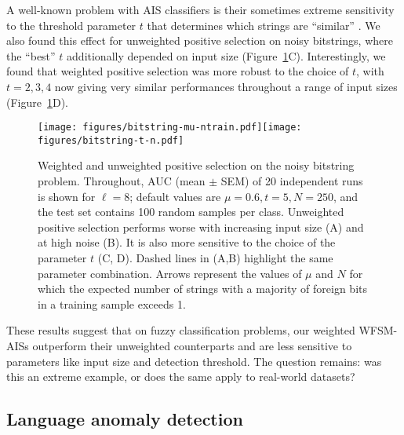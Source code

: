 \documentclass{llncs}
\begin{document}
A well-known problem with AIS classifiers  is their sometimes extreme sensitivity to the 
threshold parameter $t$ that determines which strings are ``similar''
\cite{Dhaeseleer1996,Dhaeseleer1996b,Stibor2005,Wortel2020t}.
We also found this effect for 
unweighted positive selection on noisy bitstrings, where the ``best'' $t$ additionally
depended on input size (Figure~\ref{figurestringdistinction}C). Interestingly, we 
found that weighted positive selection was more robust to the choice of $t$, with 
$t = 2,3,4$ now giving very similar performances throughout a range of input sizes (Figure~\ref{figurestringdistinction}D).


\begin{figure}[t]
  \centering
   \texttt{[image: figures/bitstring-mu-ntrain.pdf]}\texttt{[image: figures/bitstring-t-n.pdf]}

   \caption{
	Weighted and unweighted positive selection on the noisy bitstring problem. Throughout, AUC 
	(mean $\pm$ SEM) of 20 independent runs is shown for $\ell=8$; default values 
	are $\mu=0.6, t=5, N=250$, and the test set contains 100 random samples per class.
	Unweighted positive selection performs worse with increasing input size (A) and
	at high noise (B). It is also more sensitive to the choice of the parameter 
	$t$ (C, D). Dashed lines in (A,B) highlight the same parameter combination.
	Arrows represent the values of $\mu$ and $N$ for which the expected number of strings 
	with a majority of foreign bits in a training  sample exceeds 1. 
  }
  \label{figurestringdistinction}
\end{figure}


These results suggest that on fuzzy classification problems, our weighted 
WFSM-AISs outperform their unweighted counterparts and are less sensitive
to parameters like input size and detection threshold. The question remains: was this
an extreme example, or does the same apply to real-world datasets?

\subsection{Language anomaly detection}
\end{document}
